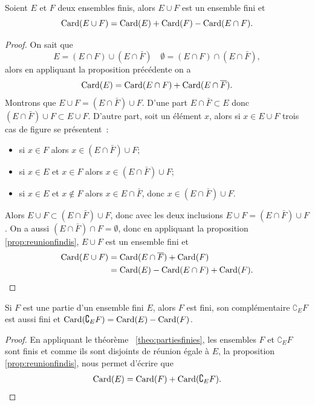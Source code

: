   \begin{prop}
    Soient \(E\) et \(F\) deux ensembles finis, alors \(E\cup F\) est un ensemble fini et
    \begin{equation}
    \operatorname{Card}(E\cup F)=\operatorname{Card}(E)+\operatorname{Card}(F)-\operatorname{Card}(E\cap F).
  \end{equation}
\end{prop}
\begin{proof}
  On sait que 
  \begin{equation}
    E=(E\cap F)\cup (E\cap \bar{F}) \quad \emptyset=(E\cap F)\cap (E\cap \bar{F}),
  \end{equation} 
  alors en appliquant la proposition précédente on a
  \begin{equation}
    \operatorname{Card}(E)=\operatorname{Card}(E\cap F)+\operatorname{Card}(E\cap \overline{F}).
  \end{equation}
  Montrons que \(E\cup F =(E\cap \bar{F}) \cup F\). D'une part \(E \cap \bar{F} \subset E\) donc \((E\cap \bar{F}) \cup F \subset E\cup F\). D'autre part, soit un élément \(x\), alors si \(x \in E \cup F\) trois cas de figure se présentent~:
  \begin{itemize}
  \item si \(x\in F\) alors \(x \in (E\cap \bar{F}) \cup F\);
  \item si \(x \in E\) et \(x \in F\) alors \(x \in (E\cap \bar{F}) \cup F\);
  \item si \(x \in E\) et \(x \notin F\) alors \(x \in E\cap \bar{F}\), donc \(x \in (E\cap \bar{F}) \cup F\).
  \end{itemize}
  Alors \(E\cup F \subset (E \cap \bar{F})\cup F\), donc avec les deux inclusions \(E\cup F =(E\cap \bar{F}) \cup F\). On a aussi \((E\cap \bar{F})\cap F=\emptyset\), donc en appliquant la proposition~
\ref{prop:reunionfindis}, \(E\cup F\) est un ensemble fini et
  \begin{align}
    \operatorname{Card}(E\cup F)&=\operatorname{Card}(E\cap \overline{F})+\operatorname{Card}(F)\\ &=\operatorname{Card}(E) - \operatorname{Card}(E\cap F)+\operatorname{Card}(F).
  \end{align}
\end{proof}
\begin{prop}
  Si \(F\) est une partie d'un ensemble fini \(E\), alors \(F\) est fini, son complémentaire \(\complement_E F\) est aussi fini et \(\operatorname{Card}(\complement_E F)=\operatorname{Card}(E)-\operatorname{Card}(F)\).
\end{prop}
\begin{proof}
  En appliquant le théorème~
\ref{theo:partiesfinies}, les ensembles \(F\) et \(\complement_E F\) sont finis et comme ils sont disjoints de réunion égale à \(E\), la proposition~
\ref{prop:reunionfindis}, nous permet d'écrire que
  \begin{equation}
    \operatorname{Card}(E)=\operatorname{Card}(F)+\operatorname{Card}(\complement_E F).
  \end{equation}
\end{proof}
